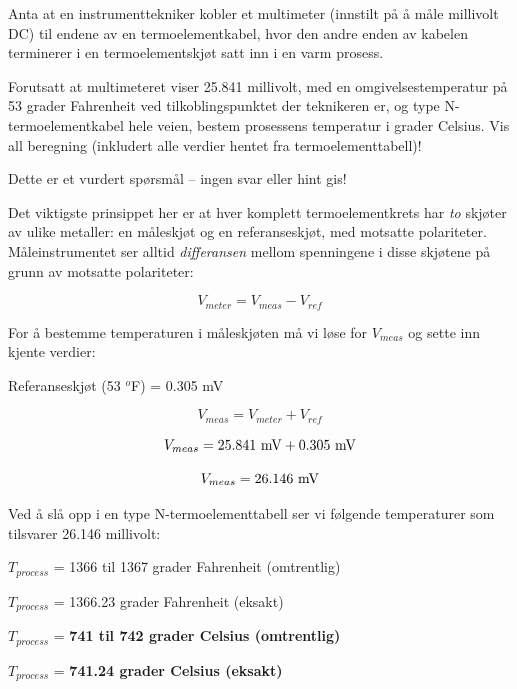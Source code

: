 

Anta at en instrumenttekniker kobler et multimeter (innstilt på å måle millivolt DC) til endene av en termoelementkabel, hvor den andre enden av kabelen terminerer i en termoelementskjøt satt inn i en varm prosess.

\vskip 10pt

Forutsatt at multimeteret viser 25.841 millivolt, med en omgivelsestemperatur på 53 grader Fahrenheit ved tilkoblingspunktet der teknikeren er, og type N-termoelementkabel hele veien, bestem prosessens temperatur i grader Celsius.  Vis all beregning (inkludert alle verdier hentet fra termoelementtabell)!


\vfil 

\eject






Dette er et vurdert spørsmål -- ingen svar eller hint gis!







Det viktigste prinsippet her er at hver komplett termoelementkrets har {\it to} skjøter av ulike metaller: en måleskjøt og en referanseskjøt, med motsatte polariteter.  Måleinstrumentet ser alltid {\it differansen} mellom spenningene i disse skjøtene på grunn av motsatte polariteter:

$$V_{meter} = V_{meas} - V_{ref}$$

For å bestemme temperaturen i måleskjøten må vi løse for $V_{meas}$ og sette inn kjente verdier:

\vskip 10pt

Referanseskjøt (53 $^{o}$F) = 0.305 mV

$$V_{meas} = V_{meter} + V_{ref}$$

$$V_{meas} = 25.841 \hbox{ mV} + 0.305 \hbox{ mV}$$

$$V_{meas} = 26.146 \hbox{ mV}$$

Ved å slå opp i en type N-termoelementtabell ser vi følgende temperaturer som tilsvarer 26.146 millivolt:

\vskip 10pt

$T_{process}$ = 1366 til 1367 grader Fahrenheit (omtrentlig)

$T_{process}$ = 1366.23 grader Fahrenheit (eksakt)

\vskip 10pt

$T_{process}$ = {\bf 741 til 742 grader Celsius (omtrentlig)}

$T_{process}$ = {\bf 741.24 grader Celsius (eksakt)}


